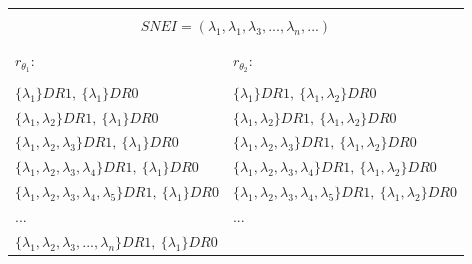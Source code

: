 	\newpage
	\begin{table}[h!]
		\begin{center}
				\begin{tabular}{|l||l|}
					\hline
						\multicolumn{2}{|c|}{\cellcolor{applegreen}  } \\
						\multicolumn{2}{|c|}{\cellcolor{applegreen} {\huge $SNEI = (\lambda_{1}, \lambda_{1}, \lambda_{3}, ... , \lambda_{n}, ...) $  }  }\\
						\multicolumn{2}{|c|}{\cellcolor{applegreen}  } \\
					\hline
					\hline
						\cellcolor{applegreen!50} & \cellcolor{applegreen!50}  \\
						\cellcolor{applegreen!50} {\LARGE $r_{\theta_{1}}$:  } & \cellcolor{applegreen!50} {\LARGE $r_{\theta_{2}}$:  } \\
						\cellcolor{applegreen!50} & \cellcolor{applegreen!50}  \\
					\hline
					\hline
						$\{\lambda_{1}\}DR1,\:\{\lambda_{1}\}DR0$ &
						$\{\lambda_{1}\}DR1,\:\{\lambda_{1}, \lambda_{2}\}DR0$ \\
						$\{\lambda_{1}, \lambda_{2}\}DR1,\:\{\lambda_{1}\}DR0$ &
						$\{\lambda_{1}, \lambda_{2}\}DR1,\:\{\lambda_{1}, \lambda_{2}\}DR0$ \\
						$\{\lambda_{1}, \lambda_{2}, \lambda_{3}\}DR1,\:\{\lambda_{1}\}DR0$ &
						$\{\lambda_{1}, \lambda_{2}, \lambda_{3}\}DR1,\:\{\lambda_{1}, \lambda_{2}\}DR0$ \\
						$\{\lambda_{1}, \lambda_{2}, \lambda_{3}, \lambda_{4}\}DR1,\:\{\lambda_{1}\}DR0$ &
						$\{\lambda_{1}, \lambda_{2}, \lambda_{3}, \lambda_{4}\}DR1,\:\{\lambda_{1}, \lambda_{2}\}DR0$ \\
						$\{\lambda_{1}, \lambda_{2}, \lambda_{3}, \lambda_{4}, \lambda_{5}\}DR1,\:\{\lambda_{1}\}DR0$ &
						$\{\lambda_{1}, \lambda_{2}, \lambda_{3}, \lambda_{4}, \lambda_{5}\}DR1,\:\{\lambda_{1}, \lambda_{2}\}DR0$ \\
						... & ... \\
						$\{\lambda_{1}, \lambda_{2}, \lambda_{3}, ... , \lambda_{n}\}DR1,\:\{\lambda_{1}\}DR0$ &

\end{tabular}
\end{center}
\end{table}

